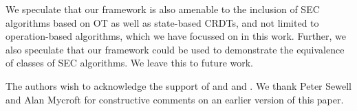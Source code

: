 \documentclass[acmlarge,review,anonymous]{acmart}
\begin{document}
We speculate that our framework is also amenable to the inclusion of SEC algorithms based on OT as well as state-based CRDTs, and not limited to operation-based algorithms, which we have focussed on in this work.
Further, we also speculate that our framework could be used to demonstrate the equivalence of classes of SEC algorithms.
We leave this to future work.

\begin{acks}
    The authors wish to acknowledge the support of
     and
     and
    .
We thank Peter Sewell and Alan Mycroft for constructive comments on an earlier version of this paper.

\end{acks}

{}
\end{document}
